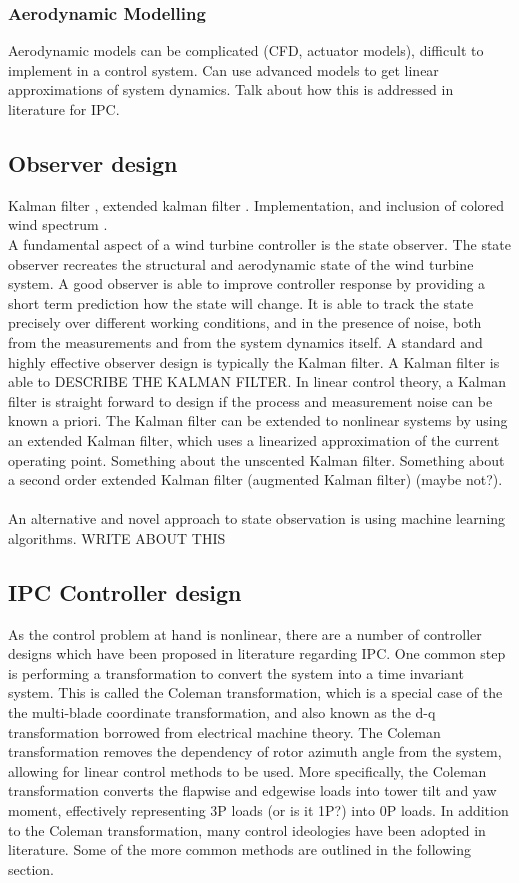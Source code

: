 \subsubsection{Aerodynamic Modelling}
Aerodynamic models can be complicated (CFD, actuator models), difficult to implement in a control system. Can use advanced models to get linear approximations of system dynamics. Talk about how this is addressed in literature for IPC.
\cite{11_Wang}

\subsection{Observer design}
Kalman filter \cite{15_bossanyi}, extended kalman filter \cite{2_Kanev}. Implementation, and inclusion of colored wind spectrum \cite{14_Selvam}. 
\\
A fundamental aspect of a wind turbine controller is the state observer. The state observer recreates the structural and aerodynamic state of the wind turbine system. A good observer is able to improve controller response by providing a short term prediction how the state will change. It is able to track the state precisely over different working conditions, and in the presence of noise, both from the measurements and from the system dynamics itself. A standard and highly effective observer design is typically the Kalman filter. A Kalman filter is able to DESCRIBE THE KALMAN FILTER. In linear control theory, a Kalman filter is straight forward to design if the process and measurement noise can be known a priori. The Kalman filter can be extended to nonlinear systems by using an extended Kalman filter, which uses a linearized approximation of the current operating point. Something about the unscented Kalman filter. Something about a second order extended Kalman filter (augmented Kalman filter) (maybe not?).
\\~\\
An alternative and novel approach to state observation is using machine learning algorithms. WRITE ABOUT THIS
\subsection{IPC Controller design}
As the control problem at hand is nonlinear, there are a number of controller designs which have been proposed in literature regarding IPC. One common step is performing a transformation to convert the system into a time invariant system. This is called the Coleman transformation, which is a special case of the the multi-blade coordinate transformation, and also known as the d-q transformation borrowed from electrical machine theory. The Coleman transformation removes the dependency of rotor azimuth angle from the system, allowing for linear control methods to be used. More specifically, the Coleman transformation converts the flapwise and edgewise loads into tower tilt and yaw moment, effectively representing 3P loads (or is it 1P?) into 0P loads. In addition to the Coleman transformation, many control ideologies have been adopted in literature. Some of the more common methods are outlined in the following section.

